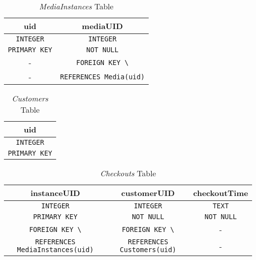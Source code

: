 \documentclass[11pt, a4paper]{article}
\begin{document}
    \begin{table}[H]
        \centering
        \begin{tabular}{|c|c|}
            \hline
            \textbf{uid}              & \textbf{mediaUID}                   \\\hline\hline
            {\lstinline|INTEGER|}     & {\lstinline|INTEGER|}               \\\hline
            {\lstinline|PRIMARY KEY|} & {\lstinline|NOT NULL|}              \\
            -                         & {\lstinline|FOREIGN KEY \|}         \\
            -                         & {\lstinline|REFERENCES Media(uid)|} \\\hline
        \end{tabular}
        \caption{\textit{MediaInstances} Table}
        \label{tab:sqlite_table_MediaInstances}
    \end{table}

    \begin{table}[H]
        \centering
        \begin{tabular}{|c|}
            \hline
            \textbf{uid}              \\\hline\hline
            {\lstinline|INTEGER|}     \\\hline
            {\lstinline|PRIMARY KEY|} \\\hline
        \end{tabular}
        \caption{\textit{Customers} Table}
        \label{tab:sqlite_table_Customers}
    \end{table}

    \begin{table}[H]
        \centering
        \begin{tabular}{|c|c|c|}
            \hline
            \textbf{instanceUID}                         & \textbf{customerUID}                    & \textbf{checkoutTime}  \\\hline\hline
            {\lstinline|INTEGER|}                        & {\lstinline|INTEGER|}                   & {\lstinline|TEXT|}     \\\hline
            {\lstinline|PRIMARY KEY|}                    & {\lstinline|NOT NULL|}                  & {\lstinline|NOT NULL|}             \\
            {\lstinline|FOREIGN KEY \|}                  & {\lstinline|FOREIGN KEY \|}             & -                     \\
            {\lstinline|REFERENCES MediaInstances(uid)|} & {\lstinline|REFERENCES Customers(uid)|} & -                     \\\hline
        \end{tabular}
        \caption{\textit{Checkouts} Table}
        \label{tab:sqlite_table_Checkouts}
    \end{table}
\end{document}
